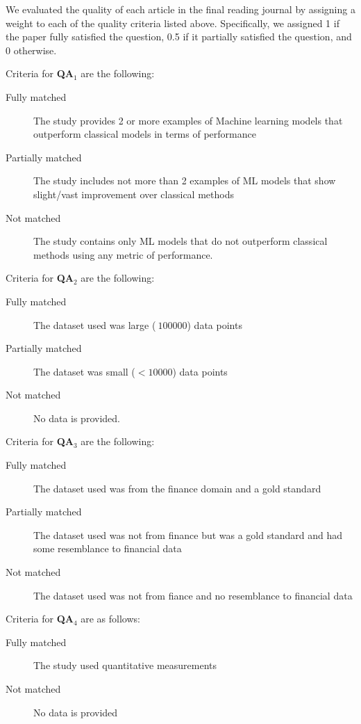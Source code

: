 \documentclass[11pt]{article}
\begin{document}
We evaluated the quality of each article in the final reading journal by assigning a weight to each of the quality criteria listed above. Specifically, we assigned 1 if the paper fully satisfied the question, 0.5 if it partially satisfied the question, and 0 otherwise.

Criteria for \textbf{QA$_1$} are the following:
\begin{description}
    \item[Fully matched] The study provides  2 or more examples of Machine learning models that outperform classical models in terms of performance
    \item[Partially matched] The study includes not more than 2 examples of ML models that show slight/vast improvement over classical methods
    \item[Not matched] The study contains only ML models that do not outperform classical methods using any metric of performance.
\end{description}

Criteria for \textbf{QA$_2$} are the following:
\begin{description}
    \item[Fully matched] The dataset used was large ($\>100000$) data points
    \item[Partially matched] The dataset was small ($<10000$) data points 
    \item[Not matched] No data is provided. 
\end{description}

Criteria for \textbf{QA$_3$} are the following:
\begin{description}
    \item[Fully matched] The dataset used was from the finance domain and a gold standard
    \item[Partially matched] The dataset used was not from finance but was a gold standard and had some resemblance to financial data
    \item[Not matched] The dataset used was not from fiance and no resemblance to financial data
\end{description}

Criteria for \textbf{QA$_4$} are as follows:
\begin{description}
    \item[Fully matched] The study used quantitative measurements 
    \item[Not matched] No data is provided
\end{description}
\end{document}
